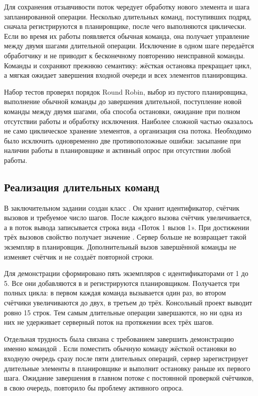 Для сохранения отзывчивости поток чередует обработку нового элемента и шага запланированной операции. Несколько длительных команд, поступивших подряд, сначала регистрируются в планировщике, после чего выполняются циклически. Если во время их работы появляется обычная команда, она получает управление между двумя шагами длительной операции. Исключение в одном шаге передаётся обработчику и не приводит к бесконечному повторению неисправной команды. Команды  и  сохраняют прежнюю семантику: жёсткая остановка прекращает цикл, а мягкая ожидает завершения входной очереди и всех элементов планировщика.

Набор тестов проверял порядок Round Robin, выбор из пустого планировщика, выполнение обычной команды до завершения длительной, поступление новой команды между двумя шагами, оба способа остановки, ожидание при полном отсутствии работы и обработку исключения. Наиболее сложной частью оказалось не само циклическое хранение элементов, а организация сна потока. Необходимо было исключить одновременно две противоположные ошибки: засыпание при наличии работы в планировщике и активный опрос при отсутствии любой работы.

\subsection{Реализация длительных команд}

В заключительном задании создан класс . Он хранит идентификатор, счётчик вызовов и требуемое число шагов. После каждого вызова  счётчик увеличивается, а в поток вывода записывается строка вида «Поток 1 вызов 1». При достижении трёх вызовов свойство  получает значение . Сервер больше не возвращает такой экземпляр в планировщик. Дополнительный вызов завершённой команды не изменяет счётчик и не создаёт повторной строки.

Для демонстрации сформировано пять экземпляров с идентификаторами от 1 до 5. Все они добавляются в  и регистрируются планировщиком. Получается три полных цикла: в первом каждая команда вызывается один раз, во втором счётчики увеличиваются до двух, в третьем до трёх. Консольный проект  выводит ровно 15 строк. Тем самым длительные операции завершаются, но ни одна из них не удерживает серверный поток на протяжении всех трёх шагов.

Отдельная трудность была связана с требованием завершить демонстрацию именно командой . Если поместить обычную команду жёсткой остановки во входную очередь сразу после пяти длительных операций, сервер зарегистрирует длительные элементы в планировщике и выполнит остановку раньше их первого шага. Ожидание завершения в главном потоке с постоянной проверкой счётчиков, в свою очередь, повторило бы проблему активного опроса.

